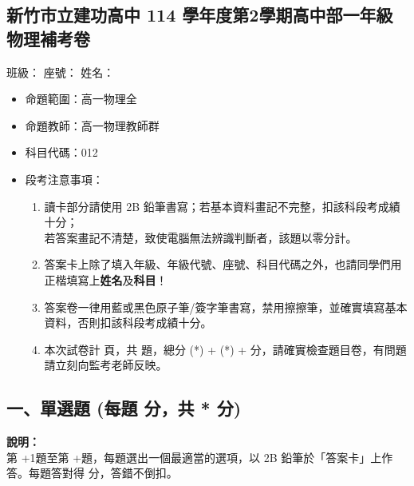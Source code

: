\documentclass[10pt,a4paper]{article}
\begin{document}
\begin{center}
    \section*{新竹市立建功高中 114 學年度第2學期高中部一年級物理補考卷}
\end{center}

\noindent \hspace*{\fill} \large 班級：\underline{\hspace{1.5cm}} 座號：\underline{\hspace{1cm}} 姓名：\underline{\hspace{2.5cm}}

\vspace{1em}

\begin{itemize}[leftmargin=1em]
    \item[$\ast$] 命題範圍：高一物理全
    \item[$\ast$] 命題教師：高一物理教師群
    \item[$\ast$] 科目代碼：012
    \item[$\ast$] 段考注意事項：
    \begin{enumerate}[label=\arabic*., leftmargin=2em]
        \item 讀卡部分請使用 2B 鉛筆書寫；若基本資料畫記不完整，扣該科段考成績十分；\\若答案畫記不清楚，致使電腦無法辨識判斷者，該題以零分計。
        \item 答案卡上除了填入年級、年級代號、座號、科目代碼之外，也請同學們用正楷填寫上\textbf{姓名}及\textbf{科目}！
        \item 答案卷一律用藍或黑色原子筆/簽字筆書寫，禁用擦擦筆，並確實填寫基本資料，否則扣該科段考成績十分。
        \item 本次試卷計 \pageref{EndOfExam} 頁，共  題，總分 \the\numexpr (*\scscore) + (*\mcscore) +  \relax 分，請確實檢查題目卷，有問題請立刻向監考老師反映。
    \end{enumerate}
\end{itemize}

\subsection*{一、單選題 (每題 \scscore 分，共 \the\numexpr {} * \scscore \relax 分)}
\begin{center}
    \begin{tcolorbox}[colframe=black, colback=white, halign=left, width=\textwidth, arc=2mm]
        \small \textbf{說明：} \\
        第 \the\numexpr\value{qcount}+1\relax 題至第 \the\numexpr\value{qcount}+\relax 題，每題選出一個最適當的選項，以 2B 鉛筆於「答案卡」上作答。每題答對得 \scscore 分，答錯不倒扣。 \\
    \end{tcolorbox}
\end{center}
\end{document}

